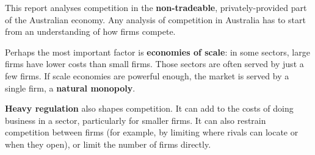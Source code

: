 This report analyses competition in the \textbf{non-tradeable}, privately-provided part of the Australian economy. Any analysis of competition in Australia has to start from an understanding of how firms compete.

Perhaps the most important factor is \textbf{economies of scale}: in some sectors, large firms have lower costs than small firms. Those sectors are often served by just a few firms. If scale economies are powerful enough, the market is served by a single firm, a \textbf{natural monopoly}.

\textbf{Heavy regulation} also shapes competition. It can add to the costs of doing business in a sector, particularly for smaller firms. It can also restrain competition between firms (for example, by limiting where rivals can locate or when they open), or limit the number of firms directly.


